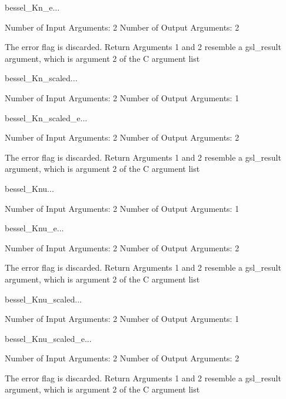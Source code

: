 \begin{funcdesc}{bessel_Kn_e}{...}

    Number of Input  Arguments:  2
    Number of Output Arguments:  2

The error flag is discarded.
Return Arguments 1 and 2 resemble a gsl_result argument,
	which is  argument 2 of the C argument list

\end{funcdesc}

\begin{funcdesc}{bessel_Kn_scaled}{...}

    Number of Input  Arguments:  2
    Number of Output Arguments:  1
\end{funcdesc}

\begin{funcdesc}{bessel_Kn_scaled_e}{...}

    Number of Input  Arguments:  2
    Number of Output Arguments:  2

The error flag is discarded.
Return Arguments 1 and 2 resemble a gsl_result argument,
	which is  argument 2 of the C argument list

\end{funcdesc}

\begin{funcdesc}{bessel_Knu}{...}

    Number of Input  Arguments:  2
    Number of Output Arguments:  1
\end{funcdesc}

\begin{funcdesc}{bessel_Knu_e}{...}

    Number of Input  Arguments:  2
    Number of Output Arguments:  2

The error flag is discarded.
Return Arguments 1 and 2 resemble a gsl_result argument,
	which is  argument 2 of the C argument list

\end{funcdesc}

\begin{funcdesc}{bessel_Knu_scaled}{...}

    Number of Input  Arguments:  2
    Number of Output Arguments:  1
\end{funcdesc}

\begin{funcdesc}{bessel_Knu_scaled_e}{...}

    Number of Input  Arguments:  2
    Number of Output Arguments:  2

The error flag is discarded.
Return Arguments 1 and 2 resemble a gsl_result argument,
	which is  argument 2 of the C argument list

\end{funcdesc}

